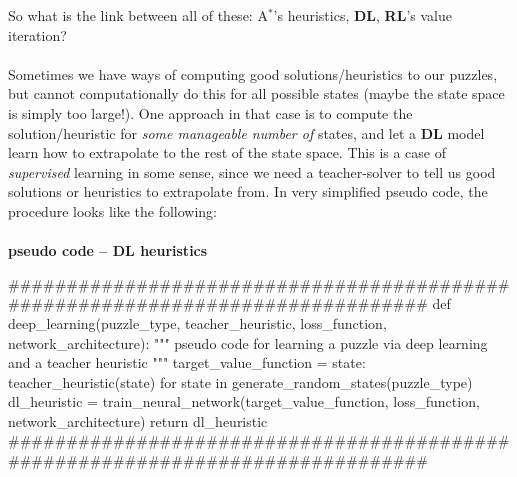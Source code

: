 
\label{sec:TheoryDLDRL}
So what is the link between all of these: A$^{*}$'s heuristics, \textbf{DL}, \textbf{RL}'s value iteration?
\\
\\
Sometimes we have ways of computing good solutions/heuristics to our puzzles, but cannot computationally do this for all possible states (maybe the state space is simply too large!). One approach in that case is to compute the solution/heuristic for \textit{some manageable number of} states, and let a \textbf{DL} model learn how to extrapolate to the rest of the state space. This is a case of \textit{supervised} learning in some sense, since we need a teacher-solver to tell us good solutions or heuristics to extrapolate from. In very simplified pseudo code, the procedure looks like the following:
\teal
\paragraph{}{\textbf{pseudo code -- \textbf{DL} heuristics}}
\begin{pseudocode}
###############################################################################
def deep_learning(puzzle_type,
                  teacher_heuristic,
                  loss_function,
                  network_architecture):
    """ pseudo code for learning a puzzle via deep learning and a teacher heuristic """
    target_value_function = {state: teacher_heuristic(state)
                             for state in generate_random_states(puzzle_type)}
    dl_heuristic = train_neural_network(target_value_function,
                                        loss_function,
                                        network_architecture)
    return dl_heuristic
###############################################################################
\end{pseudocode}
\black


